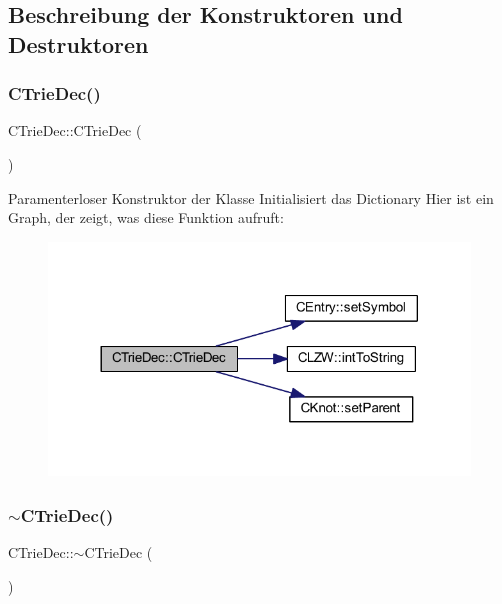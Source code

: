 \subsection{Beschreibung der Konstruktoren und Destruktoren}
\mbox{\label{class_c_trie_dec_a64323697e83419686801b04c5b12ac37}} 
\subsubsection{\texorpdfstring{C\+Trie\+Dec()}{CTrieDec()}}
{\footnotesize\ttfamily C\+Trie\+Dec\+::\+C\+Trie\+Dec (\begin{DoxyParamCaption}{ }\end{DoxyParamCaption})}

Paramenterloser Konstruktor der Klasse Initialisiert das Dictionary Hier ist ein Graph, der zeigt, was diese Funktion aufruft\+:
\nopagebreak
\begin{figure}[H]
\begin{center}
\leavevmode
\includegraphics[width=317pt]{class_c_trie_dec_a64323697e83419686801b04c5b12ac37_cgraph}
\end{center}
\end{figure}
\mbox{\label{class_c_trie_dec_a2e3dee1b9fae4e8fd82a7ba6247bb564}} 
\subsubsection{\texorpdfstring{$\sim$\+C\+Trie\+Dec()}{~CTrieDec()}}
{\footnotesize\ttfamily C\+Trie\+Dec\+::$\sim$\+C\+Trie\+Dec (\begin{DoxyParamCaption}{ }\end{DoxyParamCaption})}

